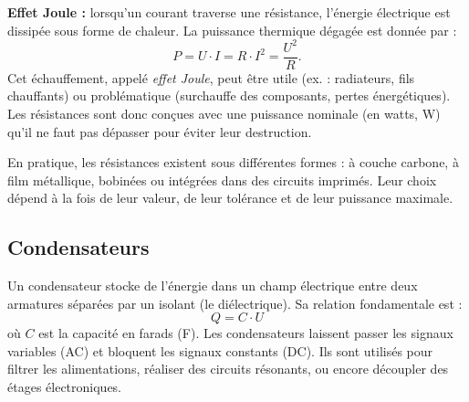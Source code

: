 \textbf{Effet Joule :} lorsqu’un courant traverse une r\'esistance, l’\'energie
\'electrique est dissip\'ee sous forme de chaleur. La puissance thermique d\'egag\'ee
est donn\'ee par :
\[
P = U \cdot I = R \cdot I^2 = \frac{U^2}{R}.
\]
Cet \'echauffement, appel\'e \emph{effet Joule}, peut \^etre utile (ex. : radiateurs,
fils chauffants) ou probl\'ematique (surchauffe des composants, pertes \'energ\'etiques).
Les r\'esistances sont donc conçues avec une puissance nominale (en watts, \unit{\watt})
qu’il ne faut pas d\'epasser pour \'eviter leur destruction.

En pratique, les r\'esistances existent sous diff\'erentes formes :
à couche carbone, à film m\'etallique, bobin\'ees ou int\'egr\'ees dans des circuits imprim\'es.
Leur choix d\'epend à la fois de leur valeur, de leur tol\'erance et de leur puissance maximale.

\subsection{Condensateurs} \label{subsec:capacitors}
Un condensateur stocke de l’\'energie dans un champ \'electrique
entre deux armatures s\'epar\'ees par un isolant (le di\'electrique).
Sa relation fondamentale est :
\[
Q = C \cdot U
\]
où \(C\) est la capacit\'e en farads (\unit{\farad}).
Les condensateurs laissent passer les signaux variables (AC)
et bloquent les signaux constants (DC).
Ils sont utilis\'es pour filtrer les alimentations,
r\'ealiser des circuits r\'esonants, ou encore d\'ecoupler des \'etages \'electroniques.

